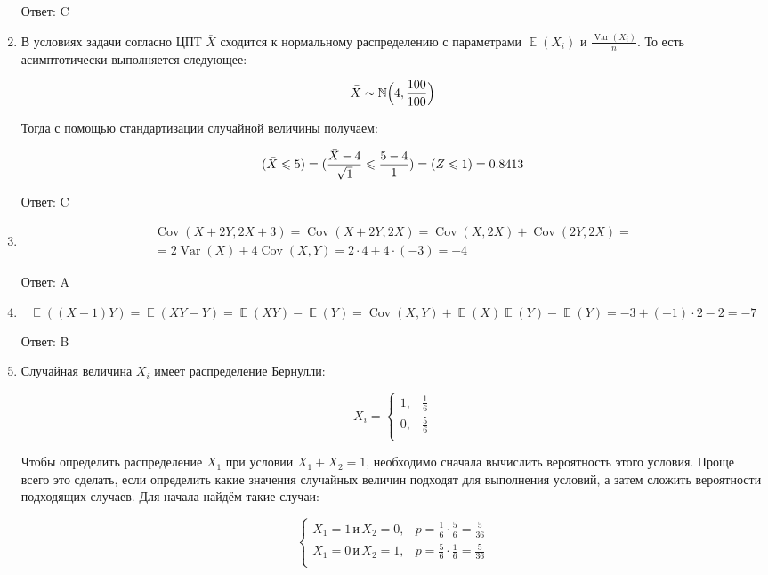 \documentclass[11pt, a4paper]{article}
\DeclareMathOperator{\Var}{Var}
\DeclareMathOperator{\Cov}{Cov}
\DeclareMathOperator{\E}{\mathbb{E}}
\let\P\relax
\DeclareMathOperator{\P}{\mathbb{P}}
\newcommand \N{\mathbb{N}}
\renewcommand{\leq}{\leqslant}
\theoremstyle{definition}
\begin{document}
\begin{enumerate}
	Ответ: C
	
	\item 
	
	В условиях задачи согласно ЦПТ $\bar{X}$ сходится к нормальному распределению с параметрами $\E(X_{i})$ и $\frac{\Var(X_{i})}{n}$. 
	То есть асимптотически выполняется следующее:
	
	\[
	\bar{X}\sim \N \Bigr(4, \frac{100}{100}\Bigl)
	\]
	
	Тогда с помощью стандартизации случайной величины получаем:
	
	\[
	\P(\bar{X}\leq 5)=\P(\frac{\bar{X}-4}{\sqrt{1}}\leq \frac{5-4}{1})=\P(Z\leq 1)=0.8413
	\]
	
	Ответ: C
	
	\item 
	
	\begin{align*}
	\Cov(X+2Y, 2X+3)=\Cov(X+2Y, 2X)=\Cov(X,2X)+\Cov(2Y,2X)=\\=2\Var(X)+4\Cov(X,Y)=2\cdot4+4\cdot(-3)=-4
	\end{align*}
	
	Ответ: A
	
	\item 
	
	\[
	\E((X-1)Y)=\E(XY-Y)=\E(XY)-\E(Y)=\Cov(X,Y)+\E(X)\E(Y)-\E(Y)=-3+(-1)\cdot2-2=-7
	\]
	
	Ответ: B
	
	\item 
	
	Случайная величина $X_{i}$ имеет распределение Бернулли:
	
	\[
	X_{i}=\begin{cases}
	1, &\frac{1}{6}\\
	0, &\frac{5}{6}\\
	\end{cases}
	\]
	
	Чтобы определить распределение $X_{1}$ при условии $X_{1}+X_{2}=1$, необходимо сначала вычислить вероятность этого условия. 
	Проще всего это сделать, если определить какие значения случайных величин подходят для выполнения условий, а затем сложить вероятности подходящих случаев. 
	Для начала найдём такие случаи:
	
	\[
	\begin{cases}
	X_{1}=1\, \text{и}\, X_{2}=0, &p=\frac{1}{6}\cdot \frac{5}{6}=\frac{5}{36}\\
	X_{1}=0\, \text{и}\, X_{2}=1, &p=\frac{5}{6}\cdot \frac{1}{6}=\frac{5}{36}\\
	\end{cases}
	\]
	

\end{enumerate}
\end{document}
